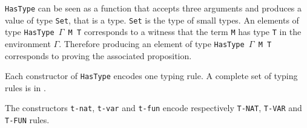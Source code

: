 \documentclass{article}
\begin{document}
\texttt{HasType} can be seen as a function that accepts three arguments and produces a value of type \texttt{Set}, that is a type.
\texttt{Set} is the type of small types.
An elements of type \texttt{HasType $\Gamma$ M T} corresponds to a witness that the term \texttt{M} has type \texttt{T} in the environment \texttt{$\Gamma$}.
Therefore producing an element of type \texttt{HasType $\Gamma$ M T} corresponds to proving the associated proposition.

Each constructor of \texttt{HasType} encodes one typing rule.
A complete set of typing rules is in \cite[p.\ 15]{crafa}.

The constructors \texttt{t-nat}, \texttt{t-var} and \texttt{t-fun} encode respectively \texttt{T-NAT}, \texttt{T-VAR} and \texttt{T-FUN} rules.





\newpage
\nocite{*}
\printbibliography
\end{document}
